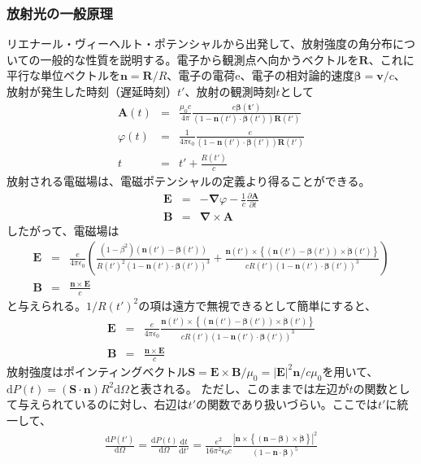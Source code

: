 \documentclass[a4paper,11pt,uplatex]{jsbook}
\begin{document}
\subsubsection{放射光の一般原理}\label{sec:general radiation}
リエナール・ヴィーヘルト・ポテンシャルから出発して、放射強度の角分布についての一般的な性質を説明する。電子から観測点へ向かうベクトルを$\bm{R}$、これに平行な単位ベクトルを$\bm{n} = \bm{R}/R$、電子の電荷e、電子の相対論的速度$\bm{\beta} = \bm{v}/c$、
放射が発生した時刻（遅延時刻）$t'$、放射の観測時刻$t$として
\begin{eqnarray}
  \bm{A}(t) &=& \frac{\mu_0 c}{4\pi}\frac{e\bm{\beta(t')}}{(1-\bm{n}(t')\cdot\bm{\beta}(t'))\bm{R}(t')}\label{retarded potential}\\
  \varphi(t) &=& \frac{1}{4\pi \epsilon_0}\frac{e}{(1-\bm{n}(t')\cdot\bm{\beta}(t'))\bm{R}(t')}\label{retarded potential phi}\\
  t &=& t' + \frac{R(t')}{c}
\end{eqnarray}
放射される電磁場は、電磁ポテンシャルの定義より得ることができる。
\begin{eqnarray}
  \bm{E} &=& -\bm{\nabla} \varphi - \frac{1}{c}\frac{\partial \bm{A}}{\partial t}\\
  \bm{B} &=& \bm{\nabla} \times \bm{A}
\end{eqnarray}
したがって、電磁場は
\begin{eqnarray}
  \bm{E} &=& \frac{e}{4\pi \epsilon_0}\left( \frac{(1-\beta^2)(\bm{n}(t')-\bm{\beta}(t'))}{R(t')^2(1-\bm{n}(t')\cdot\bm{\beta}(t'))^3}+
  \frac{\bm{n}(t')\times \left\{ (\bm{n}(t')-\bm{\beta}(t'))\times \bm{\dot{\beta}}(t')\right\}}{cR(t')(1-\bm{n}(t')\cdot\bm{\beta}(t'))^3} \right)\\
  \bm{B} &=& \frac{\bm{n}\times\bm{E}}{c}
\end{eqnarray}
と与えられる。$1/R(t')^2$の項は遠方で無視できるとして簡単にすると、
\begin{eqnarray}\label{eq:e field}
  \bm{E} &=& \frac{e}{4\pi \epsilon_0}\frac{\bm{n}(t')\times \left\{ (\bm{n}(t')-\bm{\beta}(t'))\times \bm{\dot{\beta}}(t')\right\}}{cR(t')(1-\bm{n}(t')\cdot\bm{\beta}(t'))^3}\\
  \bm{B} &=& \frac{\bm{n}\times\bm{E}}{c}
\end{eqnarray}
放射強度はポインティングベクトル$\bm{S} =\bm{E}\times \bm{B}/\mu_0 = |\bm{E}|^2\bm{n}/c\mu_0$を用いて、$\text{d}P(t) = (\bm{S}\cdot\bm{n})R^2\text{d}\Omega$と表される。
ただし、このままでは左辺が$t$の関数として与えられているのに対し、右辺は$t'$の関数であり扱いづらい。ここでは$t'$に統一して、
\begin{eqnarray} \label{eq:power}
  \frac{\text{d}P(t')}{\text{d}\Omega} = \frac{\text{d}P(t)}{\text{d}\Omega}\frac{\text{d}t}{\text{d}t'} = \frac{e^2}{16\pi^2 \epsilon_0 c}\frac{\left|\bm{n}\times \left\{ (\bm{n}-\bm{\beta})\times \bm{\dot{\beta}}\right\}\right|^2}{(1-\bm{n}\cdot\bm{\beta})^5}
\end{eqnarray}
\end{document}
